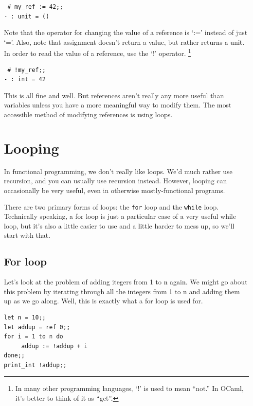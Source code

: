 \documentclass[10pt]{book}
\begin{document}
\beforeverb
\begin{verbatim}
 # my_ref := 42;;
- : unit = ()
\end{verbatim}
\afterverb

Note that the operator for changing the value of a reference is `:=' instead of just `='. Also, note that
assignment doesn't return a value, but rather returns a unit. In order to read the value of a reference, use
the `!' operator. \footnote{In many other programming languages, `!' is used to mean ``not.'' In OCaml, it's 
better to think of it as ``get''.}

\beforeverb
\begin{verbatim}
 # !my_ref;;
- : int = 42
\end{verbatim}
\afterverb

This is all fine and well. But references aren't really any more useful than variables
unless you have a more meaningful way to modify them. The most accessible
method of modifying references is using loops.

\section{Looping}

In functional programming, we don't really like loops. We'd much rather
use recursion, and you can usually use recursion instead. However, looping
can occasionally be very useful, even in otherwise mostly-functional programs.


There are two primary forms of loops: the {\tt for} loop and the {\tt while}
loop. Technically speaking, a for loop is just a particular case of a very useful
while loop, but it's also a little easier to use and a little harder to mess up, so
we'll start with that.

\subsection{For loop}

Let's look at the problem of adding itegers from 1 to n again. 
We might go about this problem by iterating through all the integers from 1 to n and 
adding them up as we go along. Well, this is exactly what a for loop is used for.

\beforeverb
\begin{verbatim}
let n = 10;;
let addup = ref 0;;
for i = 1 to n do
     addup := !addup + i
done;;
print_int !addup;;
\end{verbatim}
\afterverb
\end{document}
